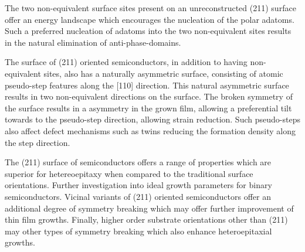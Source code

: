 The two non-equivalent surface sites present on an unreconstructed (211) surface offer an energy landscape which encourages the nucleation of the polar adatoms.
Such a preferred nucleation of adatoms into the two non-equivalent sites results in the natural elimination of anti-phase-domains.

The surface of (211) oriented semiconductors, in addition to having non-equivalent sites, also has a naturally asymmetric surface, consisting of atomic pseudo-step features along the [110] direction.
This natural asymmetric surface results in two non-equivalent directions on the surface.
The broken symmetry of the surface results in a asymmetry in the grown film, allowing a preferential tilt towards to the pseudo-step direction, allowing strain reduction.
Such pseudo-steps also affect defect mechanisms such as twins reducing the formation density along the step direction.

The (211) surface of semiconductors offers a range of properties which are superior for hetereoepitaxy when compared to the traditional surface orientations.
Further investigation into ideal growth parameters for binary semiconductors.
Vicinal variants of (211) oriented semiconductors offer an additional degree of symmetry breaking which may offer further improvement of thin film growths.
Finally, higher order substrate orientations other than (211) may other types of symmetry breaking which also enhance heteroepitaxial growths.
